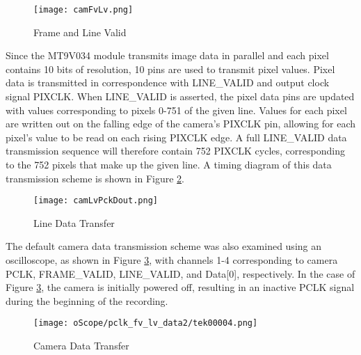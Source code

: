 \begin{figure}[H]
	\centerline{\texttt{[image: camFvLv.png]}}
	\caption{Frame and Line Valid \cite{mt9v034}}
	\label{FvLv}
\end{figure}

\par
Since the MT9V034 module transmits image data in parallel and each pixel contains 10 bits of resolution, 10 pins are used to transmit pixel values. Pixel data is transmitted in correspondence with LINE\_VALID and output clock signal PIXCLK. When LINE\_VALID is asserted, the pixel data pins are updated with values corresponding to pixels 0-751 of the given line. Values for each pixel are written out on the falling edge of the camera's PIXCLK pin, allowing for each pixel's value to be read on each rising PIXCLK edge. A full LINE\_VALID data transmission sequence will therefore contain 752 PIXCLK cycles, corresponding to the 752 pixels that make up the given line. A timing diagram of this data transmission scheme is shown in Figure \ref{LvDout}.  
\begin{figure}[H]
	\centerline{\texttt{[image: camLvPckDout.png]}}
	\caption{Line Data Transfer \cite{mt9v034}}
	\label{LvDout}
\end{figure}

\par
The default camera data transmission scheme was also examined using an oscilloscope, as shown in Figure \ref{camDataTransfer}, with channels 1-4 corresponding to camera PCLK, FRAME\_VALID, LINE\_VALID, and Data[0], respectively. In the case of Figure \ref{camDataTransfer}, the camera is initially powered off, resulting in an inactive PCLK signal during the beginning of the recording.
\begin{figure}[H]
	\centerline{\texttt{[image: oScope/pclk\_fv\_lv\_data2/tek00004.png]}}
	\caption{Camera Data Transfer}
	\label{camDataTransfer}
\end{figure}


